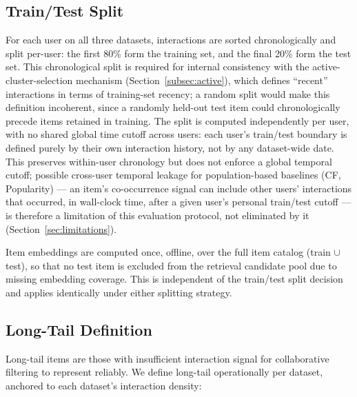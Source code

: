 \documentclass[11pt,a4paper]{article}
\begin{document}
\subsection{Train/Test Split}
For each user on all three datasets, interactions are sorted chronologically and
split per-user: the first 80\% form the training set, and the final 20\%
form the test set. This chronological split is required for internal
consistency with the active-cluster-selection mechanism
(Section~\ref{subsec:active}), which defines ``recent'' interactions in terms
of training-set recency; a random split would make this definition
incoherent, since a randomly held-out test item could chronologically
precede items retained in training. The split is computed independently
per user, with no shared global time cutoff across users: each user's
train/test boundary is defined purely by their own interaction history,
not by any dataset-wide date. This preserves within-user chronology but
does not enforce a global temporal cutoff; possible cross-user temporal
leakage for population-based baselines (CF, Popularity) --- an item's
co-occurrence signal can include other users' interactions that occurred,
in wall-clock time, after a given user's personal train/test cutoff --- is
therefore a limitation of this evaluation protocol, not eliminated by it
(Section~\ref{sec:limitations}).

Item embeddings are computed once, offline, over the full item catalog
(train $\cup$ test), so that no test item is excluded from the retrieval
candidate pool due to missing embedding coverage. This is independent of the
train/test split decision and applies identically under either splitting
strategy.

\subsection{Long-Tail Definition}
Long-tail items are those with insufficient interaction signal for
collaborative filtering to represent reliably. We define long-tail
operationally per dataset, anchored to each dataset's interaction density:
\end{document}
